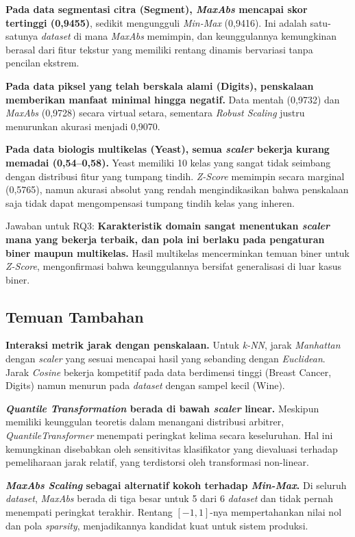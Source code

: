 \documentclass[12pt,a4paper]{article}
\begin{document}
\textbf{Pada data segmentasi citra (Segment), \textit{MaxAbs} mencapai skor
tertinggi (0,9455)}, sedikit mengungguli \textit{Min-Max} (0,9416). Ini adalah
satu-satunya \textit{dataset} di mana \textit{MaxAbs} memimpin, dan keunggulannya
kemungkinan berasal dari fitur tekstur yang memiliki rentang dinamis bervariasi
tanpa pencilan ekstrem.

\textbf{Pada data piksel yang telah berskala alami (Digits), penskalaan
memberikan manfaat minimal hingga negatif.} Data mentah (0,9732) dan
\textit{MaxAbs} (0,9728) secara virtual setara, sementara \textit{Robust
Scaling} justru menurunkan akurasi menjadi 0,9070.

\textbf{Pada data biologis multikelas (Yeast), semua \textit{scaler} bekerja
kurang memadai (0,54--0,58).} Yeast memiliki 10 kelas yang sangat tidak
seimbang dengan distribusi fitur yang tumpang tindih. \textit{Z-Score} memimpin
secara marginal (0,5765), namun akurasi absolut yang rendah mengindikasikan
bahwa penskalaan saja tidak dapat mengompensasi tumpang tindih kelas yang
inheren.

Jawaban untuk RQ3: \textbf{Karakteristik domain sangat menentukan \textit{scaler}
mana yang bekerja terbaik, dan pola ini berlaku pada pengaturan biner maupun
multikelas.} Hasil multikelas mencerminkan temuan biner untuk \textit{Z-Score},
mengonfirmasi bahwa keunggulannya bersifat generalisasi di luar kasus biner.

\subsection{Temuan Tambahan}
\label{sec:additional}

\textbf{Interaksi metrik jarak dengan penskalaan.} Untuk \textit{k-NN}, jarak
\textit{Manhattan} dengan \textit{scaler} yang sesuai mencapai hasil yang
sebanding dengan \textit{Euclidean}. Jarak \textit{Cosine} bekerja kompetitif
pada data berdimensi tinggi (Breast Cancer, Digits) namun menurun pada
\textit{dataset} dengan sampel kecil (Wine).

\textbf{\textit{Quantile Transformation} berada di bawah \textit{scaler}
linear.} Meskipun memiliki keunggulan teoretis dalam menangani distribusi
arbitrer, \textit{QuantileTransformer} menempati peringkat kelima secara
keseluruhan. Hal ini kemungkinan disebabkan oleh sensitivitas klasifikator
yang dievaluasi terhadap pemeliharaan jarak relatif, yang terdistorsi oleh
transformasi non-linear.

\textbf{\textit{MaxAbs Scaling} sebagai alternatif kokoh terhadap
\textit{Min-Max}.} Di seluruh \textit{dataset}, \textit{MaxAbs} berada di
tiga besar untuk 5 dari 6 \textit{dataset} dan tidak pernah menempati
peringkat terakhir. Rentang $[-1, 1]$-nya mempertahankan nilai nol dan pola
\textit{sparsity}, menjadikannya kandidat kuat untuk sistem produksi.
\end{document}
